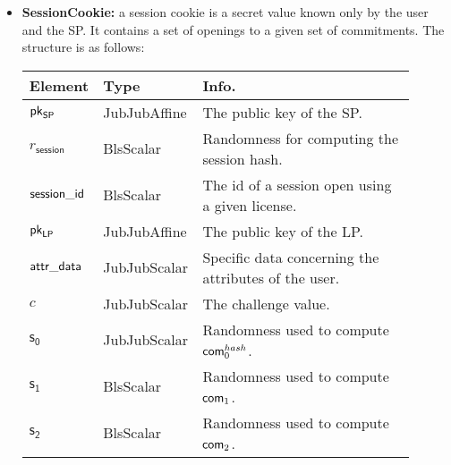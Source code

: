 \begin{itemize}
    \item \textbf{SessionCookie:} a session cookie is a secret value known only by the user and the SP. It contains a set of openings to a given set of commitments. The structure is as follows:

    \begin{center}
        \begin{tabular}{ | p{0.15\linewidth} | p{0.2\linewidth} | p{0.55\linewidth} | } 
        \hline
        \textbf{Element} & \textbf{Type} & \textbf{Info.} \\
        \hline
        $\mathsf{pk}_{\mathsf{SP}}$ & JubJubAffine & The public key of the SP. \\
        $r_\mathsf{session}$ & BlsScalar & Randomness for computing the session hash. \\
        $\mathsf{session\_id}$ & BlsScalar & The id of a session open using a given license. \\ 
        $\mathsf{pk}_{\mathsf{LP}}$ & JubJubAffine & The public key of the LP. \\ 
        $\mathsf{attr\_data}$ & JubJubScalar & Specific data concerning the attributes of the user. \\ 
        $c$ & JubJubScalar & The challenge value. \\ 
        $\mathsf{s_0}$ & JubJubScalar & Randomness used to compute $\mathsf{com}_0^{hash}$. \\
        $\mathsf{s_1}$ & BlsScalar & Randomness used to compute $\mathsf{com}_1$. \\
        $\mathsf{s_2}$ & BlsScalar & Randomness used to compute $\mathsf{com}_2$. \\
        \hline
        \end{tabular}
    \end{center}

\end{itemize}